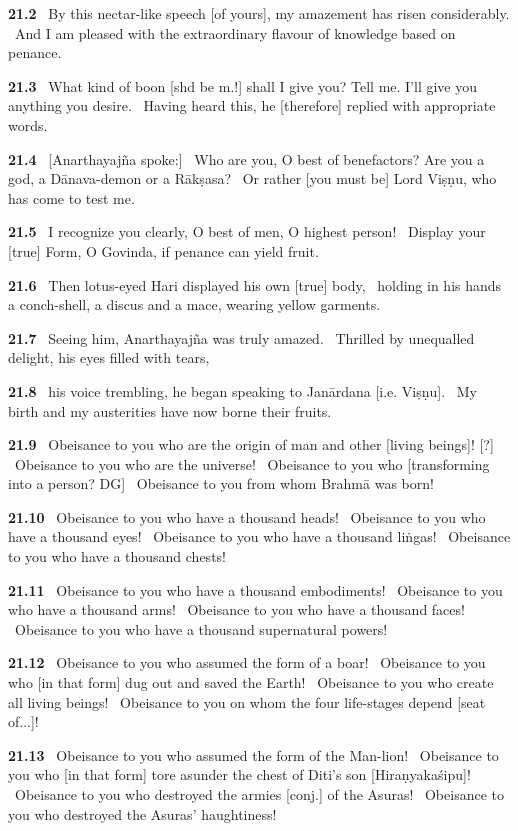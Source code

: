 \documentclass{article}
\begin{document}
\textbf{21.2}%
\ By this nectar-like speech [of yours], my amazement has risen considerably.%
\ And I am pleased with the extraordinary flavour of knowledge based on penance.%


\textbf{21.3}%
\ What kind of boon [shd be m.!] shall I give you? Tell me. I'll give you anything you desire.%
\ Having heard this, he [therefore] replied with appropriate words.%


\textbf{21.4}%
\ [Anarthayajña spoke:]%
\ Who are you, O best of benefactors? Are you a god, a Dānava-demon or a Rākṣasa?%
\ Or rather [you must be] Lord Viṣṇu, who has come to test me.%


\textbf{21.5}%
\ I recognize you clearly, O best of men, O highest person!%
\ Display your [true] Form, O Govinda, if penance can yield fruit.%


\textbf{21.6}%
\ Then lotus-eyed Hari displayed his own [true] body,%
\ holding in his hands a conch-shell, a discus and a mace, wearing yellow garments.%


\textbf{21.7}%
\ Seeing him, Anarthayajña was truly amazed.%
\ Thrilled by unequalled delight, his eyes filled with tears,%


\textbf{21.8}%
\ his voice trembling, he began speaking to Janārdana [i.e. Viṣṇu].%
\ My birth and my austerities have now borne their fruits.%


\textbf{21.9}%
\ Obeisance to you who are the origin of man and other [living beings]! [?]%
\ Obeisance to you who are the universe!%
\ Obeisance to you who [transforming into a person? DG]%
\ Obeisance to you from whom Brahmā was born!%


\textbf{21.10}%
\ Obeisance to you who have a thousand heads!%
\ Obeisance to you who have a thousand eyes!%
\ Obeisance to you who have a thousand liṅgas!%
\ Obeisance to you who have a thousand chests!%


\textbf{21.11}%
\ Obeisance to you who have a thousand embodiments!%
\ Obeisance to you who have a thousand arms!%
\ Obeisance to you who have a thousand faces!%
\ Obeisance to you who have a thousand supernatural powers!%


\textbf{21.12}%
\ Obeisance to you who assumed the form of a boar!%
\ Obeisance to you who [in that form] dug out and saved the Earth!%
\ Obeisance to you who create all living beings!%
\ Obeisance to you on whom the four life-stages depend [seat of...]!%


\textbf{21.13}%
\ Obeisance to you who assumed the form of the Man-lion!%
\ Obeisance to you who [in that form] tore asunder the chest of Diti's son [Hiraṇyakaśipu]!%
\ Obeisance to you who destroyed the armies [conj.] of the Asuras!%
\ Obeisance to you who destroyed the Asuras' haughtiness!%
\end{document}
